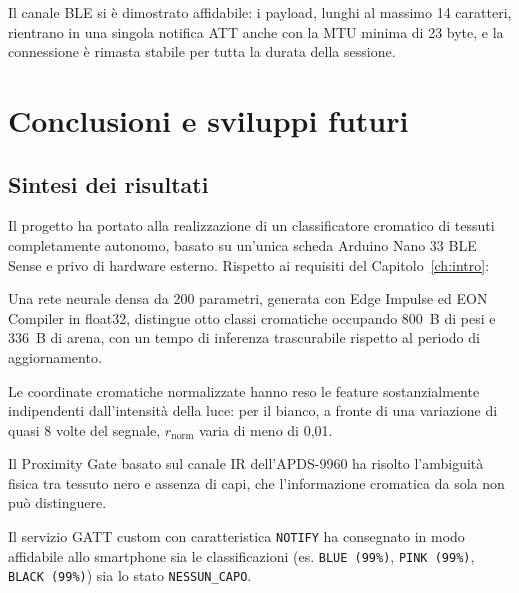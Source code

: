 \documentclass[11pt,a4paper,twoside,openany]{report}
\newenvironment{toollist}{%
  \begin{description}[
    style=nextline,
    leftmargin=0pt,
    labelindent=0pt,
    font=\normalfont\bfseries,
    itemsep=6pt
  ]
}{%
  \end{description}
}
\newcommand{\rn}{r_{\mathrm{norm}}}
\begin{document}
Il canale BLE si è dimostrato affidabile: i payload, lunghi al massimo
14 caratteri, rientrano in una singola notifica ATT anche con la MTU
minima di 23 byte, e la connessione è rimasta stabile per tutta la
durata della sessione.

\chapter{Conclusioni e sviluppi futuri}
\label{ch:conclusioni}

\section{Sintesi dei risultati}

Il progetto ha portato alla realizzazione di un classificatore
cromatico di tessuti completamente autonomo, basato su un'unica scheda
Arduino Nano 33 BLE Sense e privo di hardware esterno. Rispetto ai
requisiti del Capitolo~\ref{ch:intro}:

\begin{toollist}
  \item[R1, R4 -- Classificazione a bordo]
        Una rete neurale densa da 200 parametri, generata con Edge
        Impulse ed EON Compiler in float32, distingue otto classi
        cromatiche occupando \SI{800}{B} di pesi e \SI{336}{B} di arena,
        con un tempo di inferenza trascurabile rispetto al periodo di
        aggiornamento.
  \item[R2 -- Robustezza all'illuminazione]
        Le coordinate cromatiche normalizzate hanno reso le feature
        sostanzialmente indipendenti dall'intensità della luce: per il
        bianco, a fronte di una variazione di quasi 8 volte del segnale,
        $\rn$ varia di meno di 0,01.
  \item[R3 -- Rilevamento della presenza]
        Il Proximity Gate basato sul canale IR dell'APDS-9960 ha risolto
        l'ambiguità fisica tra tessuto nero e assenza di capi, che
        l'informazione cromatica da sola non può distinguere.
  \item[R5 -- Notifica wireless]
        Il servizio GATT custom con caratteristica \texttt{NOTIFY} ha
        consegnato in modo affidabile allo smartphone sia le
        classificazioni (es. \texttt{BLUE (99\%)}, \texttt{PINK (99\%)},
        \texttt{BLACK (99\%)}) sia lo stato \texttt{NESSUN\_CAPO}.
\end{toollist}
\end{document}
